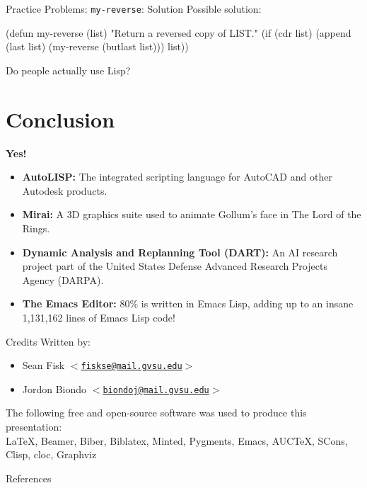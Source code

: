 \documentclass{beamer}
\newcommand{\mailtohref}[1]{\href{mailto:#1}{$<$\nolinkurl{#1}$>$}}
\begin{document}

\begin{frame}[fragile]{Practice Problems: \texttt{my-reverse}: Solution}
  Possible solution:
  \begin{clcode}
(defun my-reverse (list)
  "Return a reversed copy of LIST."
  (if (cdr list)
      (append (last list) (my-reverse (butlast list)))
    list))
  \end{clcode}
\end{frame}

\begin{frame}{Do people actually use Lisp?}
\section{Conclusion}
  \textbf{Yes!}
  \begin{itemize}
  \item \textbf{AutoLISP:} The integrated scripting language for AutoCAD and
    other Autodesk products.
  \item \textbf{Mirai:} A 3D graphics suite used to animate Gollum's face in The Lord of the Rings.
  \item \textbf{Dynamic Analysis and Replanning Tool (DART):} An AI research
    project part of the United States Defense Advanced Research
    Projects Agency (DARPA).
  \item \textbf{The Emacs Editor:} 80\% is written in Emacs Lisp,
    adding up to an insane 1,131,162 lines of Emacs Lisp code!
  \end{itemize}
\end{frame}

\begin{frame}{Credits}
  Written by:
  \begin{itemize}
  \item Sean Fisk \mailtohref{fiskse@mail.gvsu.edu}
  \item Jordon Biondo \mailtohref{biondoj@mail.gvsu.edu}
  \end{itemize}
  The following free and open-source software was used to produce this presentation: \\
  \LaTeX, Beamer, Biber, Biblatex, Minted, Pygments, Emacs, AUCTeX, SCons, Clisp, cloc, Graphviz
\end{frame}
\begin{frame}{References}
  \printbibliography
\end{frame}
\end{document}
